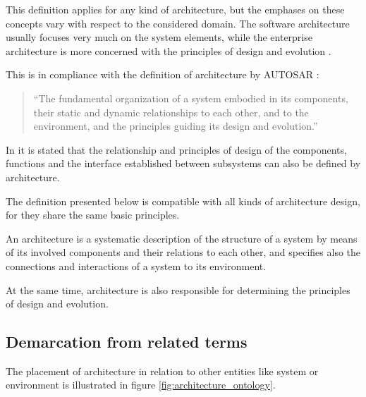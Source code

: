 This definition applies for any kind of architecture, but the emphases on these concepts vary with respect to the considered domain. The software architecture usually focuses very much on the system elements, while the enterprise architecture is more concerned with the principles of design and evolution \cite{ISO_42010}.

This is in compliance with the definition of architecture by \mbox{AUTOSAR} \cite{autosar_glossary}:
\begin{quote}
``The fundamental organization of a system embodied in its components, their static and dynamic relationships to each other, and to the environment, and the principles guiding its design and evolution.''
\end{quote}

In \cite{rodrigues2011} it is stated that the relationship and principles of design of the components, functions and the interface established between subsystems can also be defined by architecture.

The definition presented below is compatible with all kinds of architecture design, for they share the same basic principles.

\begin{myquote}
An architecture is a systematic description of the structure of a system by means of its involved components and their relations to each other, and specifies also the connections and interactions of a system to its environment.

At the same time, architecture is also responsible for determining the principles of design and evolution.
\end{myquote}


\subsection{Demarcation from related terms}
The placement of architecture in relation to other entities like system or environment is illustrated in figure \ref{fig:architecture_ontology}. 

